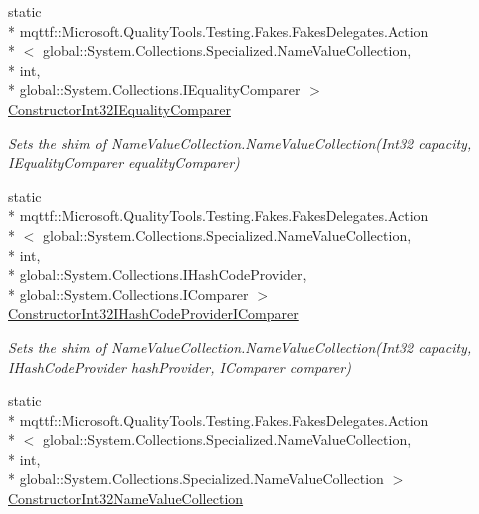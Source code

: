 \begin{DoxyCompactItemize}
static \\*
mqttf\-::\-Microsoft.\-Quality\-Tools.\-Testing.\-Fakes.\-Fakes\-Delegates.\-Action\\*
$<$ global\-::\-System.\-Collections.\-Specialized.\-Name\-Value\-Collection, \\*
int, \\*
global\-::\-System.\-Collections.\-I\-Equality\-Comparer $>$ \hyperlink{class_system_1_1_collections_1_1_specialized_1_1_fakes_1_1_shim_name_value_collection_a9e52dbcfd58ea5f3cd9ae4da7f689c9a}{Constructor\-Int32\-I\-Equality\-Comparer}
\begin{DoxyCompactList}\small\item\em Sets the shim of Name\-Value\-Collection.\-Name\-Value\-Collection(\-Int32 capacity, I\-Equality\-Comparer equality\-Comparer)\end{DoxyCompactList}\item 
static \\*
mqttf\-::\-Microsoft.\-Quality\-Tools.\-Testing.\-Fakes.\-Fakes\-Delegates.\-Action\\*
$<$ global\-::\-System.\-Collections.\-Specialized.\-Name\-Value\-Collection, \\*
int, \\*
global\-::\-System.\-Collections.\-I\-Hash\-Code\-Provider, \\*
global\-::\-System.\-Collections.\-I\-Comparer $>$ \hyperlink{class_system_1_1_collections_1_1_specialized_1_1_fakes_1_1_shim_name_value_collection_aebc78f559f7b56d5fca777bf07849ddd}{Constructor\-Int32\-I\-Hash\-Code\-Provider\-I\-Comparer}
\begin{DoxyCompactList}\small\item\em Sets the shim of Name\-Value\-Collection.\-Name\-Value\-Collection(\-Int32 capacity, I\-Hash\-Code\-Provider hash\-Provider, I\-Comparer comparer)\end{DoxyCompactList}\item 
static \\*
mqttf\-::\-Microsoft.\-Quality\-Tools.\-Testing.\-Fakes.\-Fakes\-Delegates.\-Action\\*
$<$ global\-::\-System.\-Collections.\-Specialized.\-Name\-Value\-Collection, \\*
int, \\*
global\-::\-System.\-Collections.\-Specialized.\-Name\-Value\-Collection $>$ \hyperlink{class_system_1_1_collections_1_1_specialized_1_1_fakes_1_1_shim_name_value_collection_a400839a0ee71105a9a2ae7350a4a2a3b}{Constructor\-Int32\-Name\-Value\-Collection}

\end{DoxyCompactItemize}
